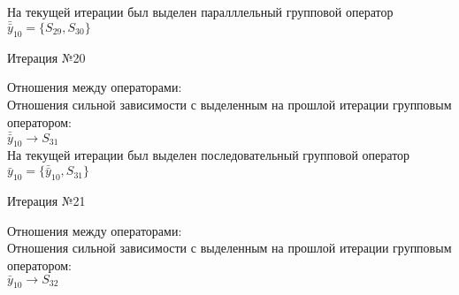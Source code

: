 \documentclass[a4paper,14pt]{article}
\begin{document}
%
На текущей итерации был выделен паралллельный групповой оператор $\bar{\bar{y}}_{10} = \{S_{29}, S_{30}\}$
\\
\begin{center} Итерация №20 \end{center}
Отношения между операторами: \\
Отношения сильной зависимости с выделенным на прошлой итерации групповым оператором: \\ \newline
\begin{math}
    \bar{\bar{y}}_{10} \rightarrow S_{31}
\end{math}\\ \newline
%
На текущей итерации был выделен последовательный групповой оператор $\bar{y}_{10} = \{\bar{\bar{y}}_{10}, S_{31}\}$
\\
\begin{center} Итерация №21 \end{center}
Отношения между операторами: \\
Отношения сильной зависимости с выделенным на прошлой итерации групповым оператором: \\ \newline
\begin{math}
    \bar{y}_{10} \rightarrow S_{32}
\end{math} \\ \\ \\ 
%
\end{document}
